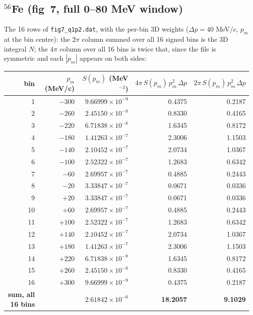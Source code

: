 \documentclass[11pt]{article}
\begin{document}
\subsection{\texorpdfstring{$^{56}$Fe}{Fe56} (fig~7, full 0--80 MeV window)}

The 16 rows of \texttt{fig7\_q1p2.dat}, with the per-bin 3D weights
($\Delta p = 40$ MeV/c, $p_m$ at the bin centre): the $2\pi$ column summed
over all 16 signed bins is the 3D integral $N$; the $4\pi$ column over all 16
bins is twice that, since the file is symmetric and each $|p_m|$ appears on
both sides:

\begin{center}\small\renewcommand{\arraystretch}{0.95}
\begin{tabular}{rrrrr}
\toprule
bin & $p_m$ (MeV/c) & $S(p_m)$ (MeV$^{-3}$) & $4\pi\,S(p_m)\,p_m^2\,\Delta p$ & $2\pi\,S(p_m)\,p_m^2\,\Delta p$ \\
\midrule
1 & $-300$ & $9.66999\times10^{-9}$ & 0.4375 & 0.2187 \\
2 & $-260$ & $2.45150\times10^{-8}$ & 0.8330 & 0.4165 \\
3 & $-220$ & $6.71838\times10^{-8}$ & 1.6345 & 0.8172 \\
4 & $-180$ & $1.41263\times10^{-7}$ & 2.3006 & 1.1503 \\
5 & $-140$ & $2.10452\times10^{-7}$ & 2.0734 & 1.0367 \\
6 & $-100$ & $2.52322\times10^{-7}$ & 1.2683 & 0.6342 \\
7 & $-60$ & $2.69957\times10^{-7}$ & 0.4885 & 0.2443 \\
8 & $-20$ & $3.33847\times10^{-7}$ & 0.0671 & 0.0336 \\
9 & $+20$ & $3.33847\times10^{-7}$ & 0.0671 & 0.0336 \\
10 & $+60$ & $2.69957\times10^{-7}$ & 0.4885 & 0.2443 \\
11 & $+100$ & $2.52322\times10^{-7}$ & 1.2683 & 0.6342 \\
12 & $+140$ & $2.10452\times10^{-7}$ & 2.0734 & 1.0367 \\
13 & $+180$ & $1.41263\times10^{-7}$ & 2.3006 & 1.1503 \\
14 & $+220$ & $6.71838\times10^{-8}$ & 1.6345 & 0.8172 \\
15 & $+260$ & $2.45150\times10^{-8}$ & 0.8330 & 0.4165 \\
16 & $+300$ & $9.66999\times10^{-9}$ & 0.4375 & 0.2187 \\
\midrule
\textbf{sum, all 16 bins} & & \textbf{$2.61842\times10^{-6}$} & \textbf{18.2057} & \textbf{9.1029} \\
\bottomrule
\end{tabular}
\end{center}
\end{document}
